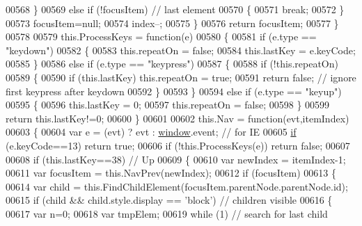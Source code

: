 \begin{DoxyCode}
00568         \}
00569         \textcolor{keywordflow}{else} \textcolor{keywordflow}{if} (!focusItem) \textcolor{comment}{// last element}
00570         \{
00571           \textcolor{keywordflow}{break};
00572         \}
00573         focusItem=null;
00574         index--;
00575       \}
00576       \textcolor{keywordflow}{return} focusItem;
00577     \}
00578 
00579     this.ProcessKeys = \textcolor{keyword}{function}(e)
00580     \{
00581       \textcolor{keywordflow}{if} (e.type == \textcolor{stringliteral}{"keydown"}) 
00582       \{
00583         this.repeatOn = \textcolor{keyword}{false};
00584         this.lastKey = e.keyCode;
00585       \}
00586       \textcolor{keywordflow}{else} \textcolor{keywordflow}{if} (e.type == \textcolor{stringliteral}{"keypress"})
00587       \{
00588         \textcolor{keywordflow}{if} (!this.repeatOn)
00589         \{
00590           \textcolor{keywordflow}{if} (this.lastKey) this.repeatOn = \textcolor{keyword}{true};
00591           \textcolor{keywordflow}{return} \textcolor{keyword}{false}; \textcolor{comment}{// ignore first keypress after keydown}
00592         \}
00593       \}
00594       \textcolor{keywordflow}{else} \textcolor{keywordflow}{if} (e.type == \textcolor{stringliteral}{"keyup"})
00595       \{
00596         this.lastKey = 0;
00597         this.repeatOn = \textcolor{keyword}{false};
00598       \}
00599       \textcolor{keywordflow}{return} this.lastKey!=0;
00600     \}
00601 
00602     this.Nav = \textcolor{keyword}{function}(evt,itemIndex) 
00603     \{
00604       var e  = (evt) ? evt : \hyperlink{jquery_8js_a04a8a2bbfa9c15500892b8e5033d625b}{window}.event; \textcolor{comment}{// for IE}
00605       \hyperlink{jquery_8js_a9db6d45a025ad692282fe23e69eeba43}{if} (e.keyCode==13) \textcolor{keywordflow}{return} \textcolor{keyword}{true};
00606       \textcolor{keywordflow}{if} (!this.ProcessKeys(e)) \textcolor{keywordflow}{return} \textcolor{keyword}{false};
00607 
00608       \textcolor{keywordflow}{if} (this.lastKey==38) \textcolor{comment}{// Up}
00609       \{
00610         var newIndex = itemIndex-1;
00611         var focusItem = this.NavPrev(newIndex);
00612         \textcolor{keywordflow}{if} (focusItem)
00613         \{
00614           var child = this.FindChildElement(focusItem.parentNode.parentNode.id);
00615           \textcolor{keywordflow}{if} (child && child.style.display == \textcolor{stringliteral}{'block'}) \textcolor{comment}{// children visible}
00616           \{ 
00617             var n=0;
00618             var tmpElem;
00619             \textcolor{keywordflow}{while} (1) \textcolor{comment}{// search for last child}

\end{DoxyCode}
